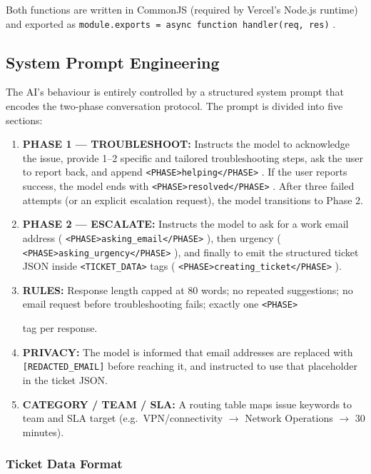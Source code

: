 \documentclass[12pt, a4paper]{article}
\newcommand{\inlinecode}[1]{%
  \colorbox{inlinecode!20}{\texttt{\small #1}}%
}
\begin{document}
Both functions are written in CommonJS (required by Vercel's Node.js runtime) and exported
as \inlinecode{module.exports = async function handler(req, res)}.

\subsection{System Prompt Engineering}
\label{sec:systemprompt}

The AI's behaviour is entirely controlled by a structured system prompt that encodes the
two-phase conversation protocol. The prompt is divided into five sections:

\begin{enumerate}[leftmargin=*, label=\arabic*.]
  \item \textbf{PHASE 1 — TROUBLESHOOT:} Instructs the model to acknowledge the issue,
        provide 1--2 specific and tailored troubleshooting steps, ask the user to report
        back, and append \inlinecode{<PHASE>helping</PHASE>}. If the user reports success,
        the model ends with \inlinecode{<PHASE>resolved</PHASE>}. After three failed
        attempts (or an explicit escalation request), the model transitions to Phase 2.
  \item \textbf{PHASE 2 — ESCALATE:} Instructs the model to ask for a work email address
        (\inlinecode{<PHASE>asking\_email</PHASE>}), then urgency
        (\inlinecode{<PHASE>asking\_urgency</PHASE>}), and finally to emit the structured
        ticket JSON inside \inlinecode{<TICKET\_DATA>} tags
        (\inlinecode{<PHASE>creating\_ticket</PHASE>}).
  \item \textbf{RULES:} Response length capped at 80 words; no repeated suggestions;
        no email request before troubleshooting fails; exactly one \inlinecode{<PHASE>}
        tag per response.
  \item \textbf{PRIVACY:} The model is informed that email addresses are replaced with
        \texttt{[REDACTED\_EMAIL]} before reaching it, and instructed to use that
        placeholder in the ticket JSON.
  \item \textbf{CATEGORY / TEAM / SLA:} A routing table maps issue keywords to team and
        SLA target (e.g.\ VPN/connectivity $\to$ Network Operations $\to$ 30 minutes).
\end{enumerate}

\subsubsection{Ticket Data Format}
\end{document}
